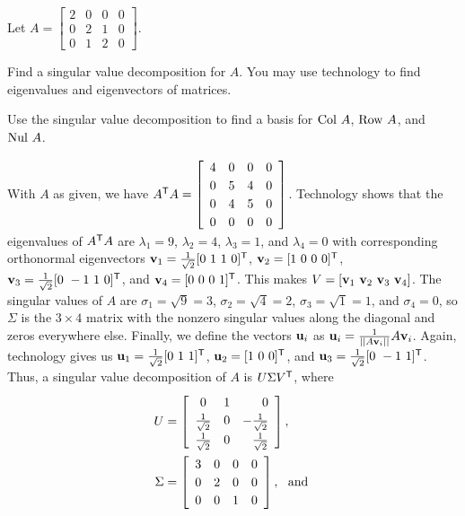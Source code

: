 \begin{example} Let $A = \left[ \begin{array}{cccc} 2  &  0  &  0  &  0 \\  0  &  2  &  1  &  0 \\ 0&1  &  2  &  0  \end{array} \right]$. 
\ba
\item Find a singular value decomposition for $A$. You may use technology to find eigenvalues and eigenvectors of matrices. 

\item Use the singular value decomposition to find a basis for $\text{Col } A$, $\text{Row } A$, and $\text{Nul } A$.

\ea


\ExampleSolution
\ba
\item With $A$ as given, we have $A^{\tr}A = \left[ \begin{array}{cccc} 4  &  0  &  0  &  0 \\  0  &  5  &  4  &  0 \\ 0  &  4  &  5  &  0 \\ 0&0&0&0 \end{array} \right]$. Technology shows that the eigenvalues of $A^{\mathsf{T}}A$ are $\lambda_1 = 9$, $\lambda_2 = 4$, $\lambda_3 = 1$, and $\lambda_4 = 0$ with corresponding orthonormal eigenvectors $\vv_1 = \frac{1}{\sqrt{2}}[0 \ 1 \ 1 \ 0]^{\tr}$, $\vv_2 = [1 \ 0 \ 0 \ 0]^{\tr}$, $\mathbf{v}_3 = \frac{1}{\sqrt{2}}[0 \ -1 \ 1 \ 0]^{\mathsf{T}}$, and $\mathbf{v}_4 = [0 \ 0 \ 0 \ 1]^{\mathsf{T}}$. This makes $V = [\mathbf{v}_1 \ \mathbf{v}_2 \ \mathbf{v}_3 \ \mathbf{v}_4]$. The singular values of $A$ are $\sigma_1 = \sqrt{9} = 3$, $\sigma_2 = \sqrt{4}= 2$, $\sigma_3 = \sqrt{1} = 1$, and $\sigma_4 = 0$, so $\Sigma$ is the $3 \times 4$ matrix with the nonzero singular values along the diagonal and zeros everywhere else. Finally, we define the vectors $\mathbf{u}_i$ as $\mathbf{u}_i = \frac{1}{||A \mathbf{v}_i||} A\mathbf{v}_i$. Again, technology gives us $\vu_1 = \frac{1}{\sqrt{2}}[0 \ 1 \ 1]^{\tr}$, $\vu_2 = [1 \ 0 \ 0]^{\tr}$, and $\mathbf{u}_3 = \frac{1}{\sqrt{2}}[0 \ -1 \ 1]^{\mathsf{T}}$. Thus, a singular value decomposition of $A$ is $U \Sigma V^{\mathsf{T}}$, where 
\begin{align*}
U &= \left[\renewcommand{\arraystretch}{1.2} \begin{array}{ccr} 0&1&0\\ \frac{1}{\sqrt{2}}&0&-\frac{1}{\sqrt{2}} \\ \frac{1}{\sqrt{2}}&0&\frac{1}{\sqrt{2}} \end{array} \right], \\
\Sigma &= \left[ \begin{array}{cccc} 3&0&0&0 \\ 0&2&0&0 \\ 0&0&1&0 \end{array} \right], \ \text{ and } \\

\end{align*}
\end{example}
